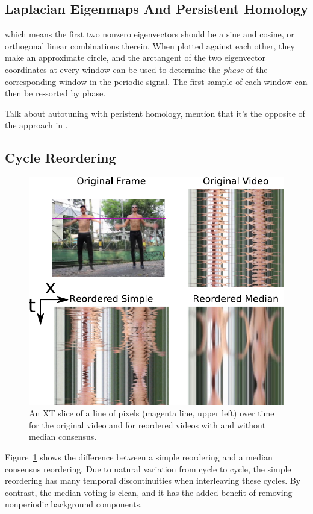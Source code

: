 \documentclass{article}
\begin{document}
\subsection{Laplacian Eigenmaps And Persistent Homology}
\label{sec:laplacian}



which means the first two nonzero eigenvectors should be a sine and cosine, or orthogonal linear combinations therein.  When plotted against each other, they make an approximate circle, and the arctangent of the two eigenvector coordinates at every window can be used to determine the {\em phase} of the corresponding window in the periodic signal.  The first sample of each window can then be re-sorted by phase.

Talk about autotuning with peristent homology, mention that it's the opposite of the approach in \cite{bendich2011improving}.

\subsection{Cycle Reordering}
\label{sec:cyclereordering}

\begin{figure}[h!]
\centering
\includegraphics[width=0.8\columnwidth]{XTSlice.pdf}
\caption{An XT slice of a line of pixels (magenta line, upper left) over time for the original video and for reordered videos with and without median consensus.}
\label{fig:XTSlice}
\end{figure}

Figure~\ref{fig:XTSlice} shows the difference between a simple reordering and a median consensus reordering.  Due to natural variation from cycle to cycle, the simple reordering has many temporal discontinuities when interleaving these cycles.  By contrast, the median voting is clean, and it has the added benefit of removing nonperiodic background components.
\end{document}
